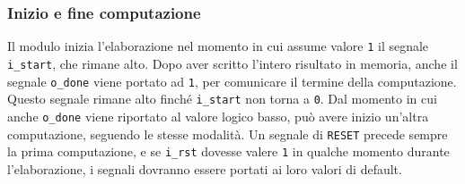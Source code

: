 \documentclass{article}
\begin{document}
\subsubsection{Inizio e fine computazione}
Il modulo inizia l'elaborazione nel momento in cui assume valore \verb^1^ il segnale \verb^i_start^, che rimane alto.
Dopo aver scritto l'intero risultato in memoria, anche il segnale \verb^o_done^ viene portato ad \verb^1^, per comunicare il termine della computazione.
Questo segnale rimane alto finché \verb^i_start^ non torna a \verb^0^.
Dal momento in cui anche \verb^o_done^ viene riportato al valore logico basso, può avere inizio un'altra computazione, seguendo le stesse modalità.
Un segnale di \verb^RESET^ precede sempre la prima computazione, e se \verb^i_rst^ dovesse valere \verb^1^ in qualche momento durante l'elaborazione, i segnali dovranno essere portati ai loro valori di default.
\end{document}
